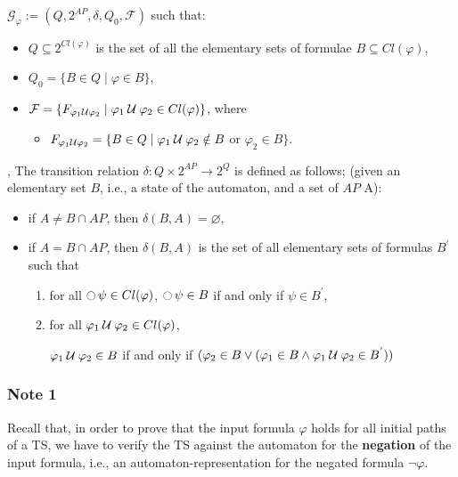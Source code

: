\documentclass{article}
\begin{document}
$\mathcal{G}_{\varphi} := (Q, 2^{AP}, \delta, Q_0, \mathcal{F})$ such that: 
\begin{itemize}
    \item $Q \subseteq 2^{Cl(\varphi)}$ is the set of all the elementary sets of formulae $B \subseteq Cl(\varphi)$,
    \item $Q_0 = \{ B \in Q \mid \varphi \in B\}$,
    \item $\mathcal{F} = \{ F_{\varphi_1 \mathbin{\mathcal{U}} \varphi_2} \mid \varphi_1 \mathbin{\mathcal{U}} \varphi_2 \in Cl(\varphi) \} $, where 
            \begin{itemize}
                \item $F_{\varphi_1 \mathbin{\mathcal{U}} \varphi_2} = \{ B \in Q \mid \varphi_1 \mathbin{\mathcal{U}} \varphi_2 \notin B$ or $\varphi_2 \in B \}$.
            \end{itemize}
\end{itemize}
, 
The transition  relation $\delta : Q \times 2^{AP} \rightarrow 2^Q$ is defined as follows;
(given an elementary set $B$, i.e., a state of the automaton, and a set of $AP$ A):
\begin{itemize}
    \item if $A \neq B \cap AP$, then $\delta(B,A) = \varnothing$,
    \item if $A = B \cap AP$, then $\delta(B,A)$ is the set of all elementary sets of formulas $B^{'}$ such that 
            \begin{enumerate}
                \item for all $\mathop{\ocircle}{\psi} \in Cl(\varphi)$, $\mathop{\ocircle}{\psi} \in B$ if and only if $\psi \in B^{'}$,
                \item for all $\varphi_1 \mathbin{\mathcal{U}} \varphi_2 \in Cl(\varphi)$, 
                
                
                    \begin{center}
                        $\varphi_1 \mathbin{\mathcal{U}} \varphi_2 \in B$ if and only if $(\varphi_2 \in B \lor (\varphi_1 \in B \land \varphi_1 \mathbin{\mathcal{U}} \varphi_2 \in B^{'}))$
                    \end{center}
            \end{enumerate}
\end{itemize}




\subsubsection*{Note 1}
Recall that, in order to prove that the input formula $\varphi$ holds for all initial paths of a TS, we have 
to verify the TS against the automaton for the \textbf{negation} of the input formula, i.e., an automaton-representation 
for the negated formula $\neg \varphi$.
\end{document}
